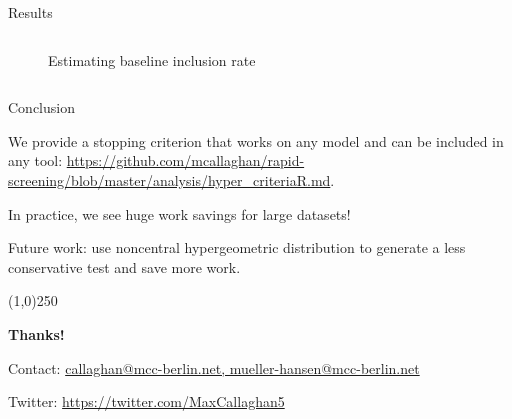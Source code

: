 \documentclass[9pt,aspectratio=169]{beamer}
\begin{document}
\begin{frame}{Results}
\begin{columns}
\begin{column}{0.382\linewidth}
\begin{figure}
{				\caption{Estimating baseline inclusion rate}
			}

		\end{figure}
	\end{column}
\end{columns}


\end{frame}


\begin{frame}{Conclusion}

We provide a stopping criterion that works on any model and can be included in any tool: \url{https://github.com/mcallaghan/rapid-screening/blob/master/analysis/hyper_criteriaR.md}.

\medskip

In practice, we see huge work savings for large datasets!

\medskip

Future work: use noncentral hypergeometric distribution to generate a less conservative test and save more work.

\begin{center}
	\line(1,0){250}
	
	\medskip
	
	\textbf{Thanks!}
	
	\medskip
	
	Contact: \url{callaghan@mcc-berlin.net, mueller-hansen@mcc-berlin.net}
	
	Twitter: \url{https://twitter.com/MaxCallaghan5}
	
\end{center}

\end{frame}
\end{document}
